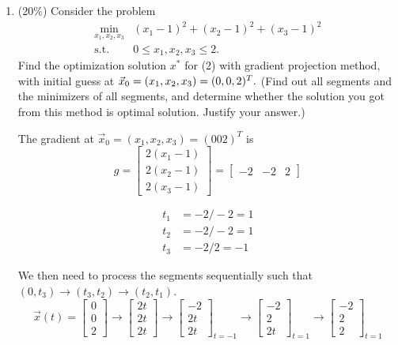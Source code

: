 \documentclass[a4paper,10pt]{article}
\begin{document}
\begin{enumerate}
    \item (20\%) Consider the problem 
    \begin{equation}\label{(2)}
        \begin{array}{cc}
            \displaystyle\min_{x_1,x_2, x_3} & (x_1-1)^2+(x_2 - 1)^2 + (x_3 - 1)^2 \\
            \mbox{s.t.} & 0\le x_1, x_2, x_3\le 2.
        \end{array}
    \end{equation}
    Find the optimization solution $x^{\ast}$ for (2) with gradient projection method, with initial guess at $\vec{x}_0 =  (x_1, x_2, x_3) = (0, 0, 2)^T.\\$
    (Find out all segments and the minimizers of all segments, and determine whether the solution you got from this method is optimal solution. Justify your answer.)
    {\color{blue}
        The gradient at $\vec{x}_0 = (x_1, x_2, x_3) = (0 0 2)^T$ is 
        \[
            g = \begin{bmatrix} 2(x_1 - 1) \\ 2(x_2 - 1) \\ 2(x_3 - 1) \end{bmatrix} = \begin{bmatrix} -2 & -2 & 2 \end{bmatrix}
        \]

        \begin{align}
            t_1 &= -2 / -2 = 1 \\ 
            t_2 &= -2 / -2 = 1 \\ 
            t_3 &= -2 / 2 = -1
        \end{align}

        We then need to process the segments sequentially such that $(0, t_3) \rightarrow (t_3, t_2) \rightarrow (t_2, t_1)$.
        \[
            \vec{x}(t) = \begin{bmatrix} 0 \\ 0 \\ 2 \end{bmatrix} \rightarrow \begin{bmatrix} 2t\\ 2t \\ 2t \end{bmatrix} \rightarrow \begin{bmatrix} -2 \\ 2t \\ 2t \end{bmatrix}_{t = -1} \rightarrow \begin{bmatrix} -2 \\ 2 \\ 2t \end{bmatrix}_{t = 1} \rightarrow \begin{bmatrix} -2 \\ 2 \\ 2 \end{bmatrix}_{t = 1}
        \]

}
\end{enumerate}
\end{document}
